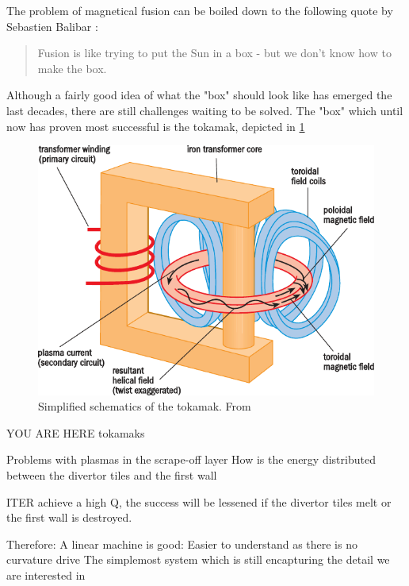 \noindent
The problem of magnetical fusion can be boiled down to the following quote by Sebastien Balibar \cite{Balibar2009Web}:
%
\begin{quote}
    Fusion is like trying to put the Sun in a box - but we don't know how to make the box.
\end{quote}
%
Although a fairly good idea of what the "box" should look like has emerged the last decades, there are still challenges waiting to be solved.
The "box" which until now has proven most successful is the tokamak, depicted in \cref{fig:tokamak}
%
\begin{figure}[htb]
    \begin{center}
        \includegraphics{fig/intro/tokamak}
    \end{center}
    \caption{Simplified schematics of the tokamak. From \cite{nuttall2008}}
    \label{fig:tokamak}
\end{figure}

\noindent



YOU ARE HERE
tokamaks



Problems with plasmas in the scrape-off layer
How is the energy distributed between the divertor tiles and the first wall


ITER achieve a high Q, the success will be lessened if the divertor tiles melt or the first wall is destroyed.



Therefore: A linear machine is good:
Easier to understand as there is no curvature drive
The simplemost system which is still encapturing the detail we are interested in

